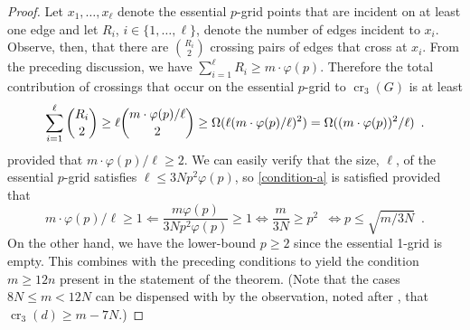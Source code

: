 \documentclass{patmorin}
\newcommand{\n}{N}
\DeclareMathOperator{\crs}{cr}
\begin{document}
\begin{proof}
  Let $x_1,\ldots,x_\ell$ denote the essential $p$-grid points that are
  incident on at least one edge and let $R_i$, $i\in\{1,\ldots,\ell\}$,
  denote the number of edges incident to $x_i$.  Observe, then, that
  there are $\binom{R_i}{2}$ crossing pairs of edges that cross at
  $x_i$.  From the preceding discussion, we have $\sum_{i=1}^\ell R_i
  \ge m\cdot\varphi(p)$.  Therefore the total contribution of crossings that
  occur on the essential $p$-grid to $\crs_3(G)$ is at least
  \begin{equation}
      \sum_{i=1}^\ell\binom{R_i}{2} \ge \ell \binom{m\cdot\varphi(p)/\ell}{2}
      \ge \Omega(\ell (m\cdot\varphi(p)/\ell)^2)
      = \Omega((m\cdot\varphi(p))^2/\ell) \enspace . \eqlabel{condition-a}
  \end{equation}
  provided that $m\cdot\varphi(p)/\ell \ge 2$.  We can easily verify
  that the size, $\ell$, of the essential $p$-grid satisfies $\ell \le
  3\n p^2\varphi(p)$, so \eqref{condition-a} is satisfied provided that
  \[
     m\cdot\varphi(p)/\ell \ge 1 \Leftarrow \frac{m\varphi(p)}{3\n p^2\varphi(p)} \ge 1 \Leftrightarrow \frac{m}{3\n} \ge p^2 \enspace \Leftrightarrow
   p \le \sqrt{m/3\n} \enspace .
  \]
  On the other hand, we have the lower-bound $p\ge 2$ since the essential
  1-grid is empty.  This combines with the preceding conditions to yield
  the condition $m\ge 12n$ present in the statement of the theorem.
  (Note that the cases $8\n\le m< 12\n$ can be dispensed with by the
  observation, noted after , that $\crs_3(d) \ge m-7\n$.)


\end{proof}
\end{document}
